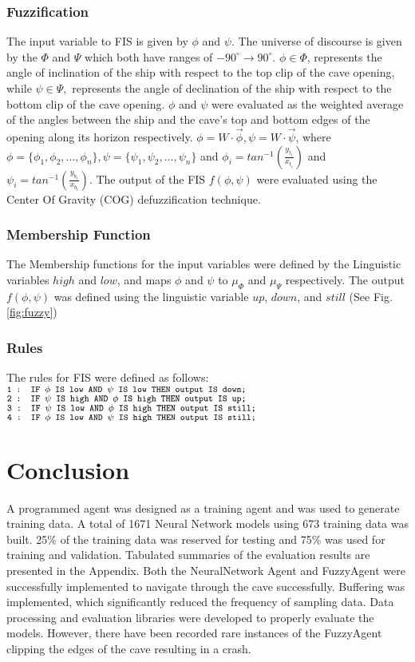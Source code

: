 \documentclass[10pt,journal,compsoc]{IEEEtran}
\begin{document}
\subsubsection*{Fuzzification}
The input variable to FIS is given by $\phi$ and $\psi$. The universe of discourse is given by the  
$\Phi$ and $\Psi$ which both have ranges of
$-90^{\circ} \to 90^{\circ}$. $\phi \in \Phi$, represents the angle of inclination of the ship with respect to the top clip of the cave
opening, while $\psi \in \Psi,$ represents the angle of declination of the ship with respect to the bottom clip
of the cave opening. $\phi$ and $\psi$ were evaluated as the weighted average of the angles between
the ship and the cave's top and bottom edges of the opening along its horizon respectively. $\phi = W \cdot \vec{\phi}, 
\psi = W \cdot \vec{\psi}$, where $\phi = \{\phi_1, \phi_2, ..., \phi_n\}, \psi = \{\psi_1, \psi_2, ..., 
\psi_n\}$ and $\phi_i = tan^{-1} \left(  \frac{y_{t_i}}{x_{t_i}}\right)$ and $\psi_i= tan^{-1} \left(  
\frac{y_{b_i}}{x_{b_i}}\right)$. 
The output of the FIS $f(\phi, \psi)$ were evaluated using the Center Of Gravity (COG) defuzzification 
technique.
\subsubsection*{Membership Function} 
The Membership functions for the input variables were defined by the Linguistic variables $high$ and $low$, and maps $\phi$ and $\psi$ to 
$\mu_{\Phi}$ and $\mu_{\Psi}$ respectively. The output $f(\phi, \psi)$ was defined using the linguistic variable
$up$, $down$, and $still$ (See Fig.\ref{fig:fuzzy})

\subsubsection*{Rules}
The rules for FIS were defined as follows: 
$\footnotesize{\texttt{1 : IF $\phi$ IS low AND $\psi$ IS low THEN output IS down;}}$
$\footnotesize{\texttt{2 : IF $\psi$ IS high AND $\phi$ IS high THEN output IS up;}}$
$\footnotesize{\texttt{3 : IF $\psi$ IS low AND $\phi$ IS high THEN output IS still;}}$
$\footnotesize{\texttt{4 : IF $\phi$ IS low AND $\psi$ IS high THEN output IS still;}}$

\section{Conclusion}

A programmed agent was designed as a training agent and was used to generate training data. 
A total of 1671 Neural Network models using 673 training data was built. 25\% of the training data was reserved for 
testing and 75\% was used for training and validation. Tabulated summaries of the evaluation results are presented 
in the Appendix. Both the NeuralNetwork Agent and FuzzyAgent were successfully implemented to navigate through the cave successfully. 
Buffering was implemented, which significantly reduced the frequency of sampling data. Data processing and evaluation 
libraries were developed to properly evaluate the models.
However, there have been recorded rare instances of the FuzzyAgent clipping the edges of the cave resulting in a crash.


\appendices

\end{document}
